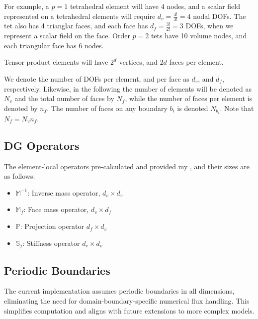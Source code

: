 \documentclass[11pt]{article}
\begin{document}
For example, a $p=1$ tetrahedral element will have 4 nodes, and a scalar field represented on a tetrahedral elements will require $d_v = \frac{4!}{3!} = 4$ nodal DOFs. The tet also has 4 trianglar faces, and each face has $d_f = \frac{3!}{2!} = 3$ DOFs, when we represent a scalar field on the face. Order $p=2$ tets have 10 volume nodes, and each triangular face has 6 nodes. 

Tensor product elements will have $2^d$ vertices, and $2d$ faces per element.

We denote the number of DOFs per element, and per face as $d_v$, and $d_f$, respectively. Likewise, in the following the number of elements will be denoted as $N_v$ and the total number of faces by $N_f$, while the number of faces per element is denoted by $n_f$.  The number of faces on any boundary $b_i$ is denoted $N_{b_i}$.  Note that $N_f = N_v n_f$.

\subsection{\ceesdcode{} DG Operators}

The element-local operators pre-calculated and provided my \ceesdcode{}, and their sizes are as follows:  
\begin{itemize}
\item $\mathbb{M}^{-1}$: Inverse mass operator, $d_v \times d_v$
\item $\mathbb{M}_f$: Face mass operator, $d_v \times d_f$
\item $\mathbb{P}$: Projection operator $d_f \times d_v$
\item $\mathbb{S}_j$: Stiffness operator $d_v \times d_v$
\end{itemize}

\subsection{Periodic Boundaries}
The current implementation assumes periodic boundaries in all dimensions, eliminating the need for domain-boundary-specific numerical flux handling. This simplifies computation and aligns with future extensions to more complex models.
\end{document}
